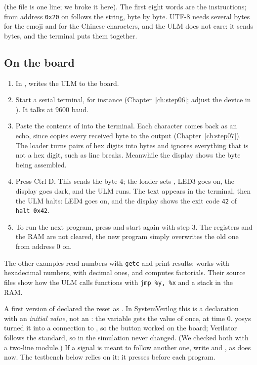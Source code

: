 (the file is one line; we broke it here). The first eight words are the
instructions; from address \texttt{0x20} on follows the string, byte by byte.
UTF-8 needs several bytes for the emoji and for the Chinese characters, and
the ULM does not care: it sends bytes, and the terminal puts them together.

\subsection*{On the board}

\begin{enumerate}
\item In ,  writes the ULM to the board.
\item Start a serial terminal, for instance 
  (Chapter~\ref{ch:step06}; adjust the device in ). It talks at
  9600 baud.
\item Paste the contents of  into the terminal. Each
  character comes back as an echo, since  copies every received
  byte to the output (Chapter~\ref{ch:step07}). The loader turns pairs of hex
  digits into bytes and ignores everything that is not a hex digit, such as
  line breaks. Meanwhile the display shows the byte being assembled.
\item Press Ctrl-D. This sends the byte 4; the loader sets , LED3
  goes on, the display goes dark, and the ULM runs. The text appears in the
  terminal, then the ULM halts: LED4 goes on, and the display shows the exit
  code \texttt{42} of \texttt{halt 0x42}.
\item To run the next program, press  and start again with step 3.
  The registers and the RAM are not cleared, the new program simply overwrites
  the old one from address 0 on.
\end{enumerate}

The other examples read numbers with \texttt{getc} and print results:
 works with hexadecimal numbers, 
with decimal ones, and  computes factorials. Their source files
show how the ULM calls functions with \texttt{jmp \%y, \%x} and a stack in the
RAM.

\begin{pitfall}
A first version of  declared the reset as .
In SystemVerilog this is a declaration with an \emph{initial value}, not an
: the variable gets the value of  once, at time 0. yosys
turned it into a connection to , so the button worked on the board;
Verilator follows the standard, so in the simulation  never changed.
(We checked both with a two-line module.) If a signal is meant to follow
another one, write  and , as
 does now. The testbench below relies on it: it presses
 before each program.
\end{pitfall}

